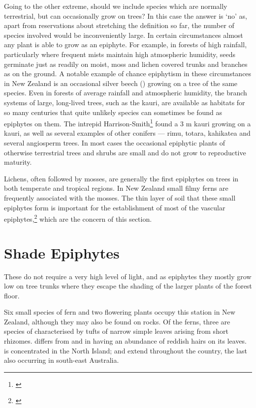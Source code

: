 Going to the other extreme, should we include species which are normally terrestrial, but can occasionally grow on trees? In this case the answer is `no' as, apart from reservations about stretching the definition so far, the number of species involved would be inconveniently large.
In certain circumstances almost any plant is able to grow as an epiphyte.
For example, in forests of high rainfall, particularly where frequent mists maintain high atmospheric humidity, seeds germinate just as readily on moist, moss and lichen covered trunks and branches as on the ground.
A notable example of chance epiphytism in these circumstances in New Zealand is an occasional silver beech () growing on a tree of the same species.
Even in forests of average rainfall and atmospheric humidity, the branch systems of large, long-lived trees, such as the kauri, are available as habitats for so many centuries that quite unlikely species can sometimes be found as epiphytes on them.
The intrepid Harrison-Smith\footnote{\cite{harrisonsmith1938kauri}} found a 3 m kauri growing on a kauri, as well as several examples of other conifers --- rimu, totara, kahikatea and several angiosperm trees.
In most cases the occasional epiphytic plants of otherwise terrestrial trees and shrubs are small and do not grow to reproductive maturity.

Lichens, often followed by mosses, are generally the first epiphytes on trees in both temperate and tropical regions.
In New Zealand small filmy ferns are frequently associated with the mosses.
The thin layer of soil that these small epiphytes form is important for the establishment of most of the vascular epiphytes,\footnote{\cite{oliver1930new}} which are the concern of this section.

\section{Shade Epiphytes}

These do not require a very high level of light, and as epiphytes they mostly grow low on tree trunks where they escape the shading of the larger plants of the forest floor.

Six small species of fern and two flowering plants occupy this station in New Zealand, although they may also be found on rocks.
Of the ferns, three are species of  characterised by tufts of narrow simple leaves arising from short rhizomes.  differs from  and  in having an abundance of reddish hairs on its leaves.  is concentrated in the North Island;  and  extend throughout the country, the last also occurring in south-east Australia.

